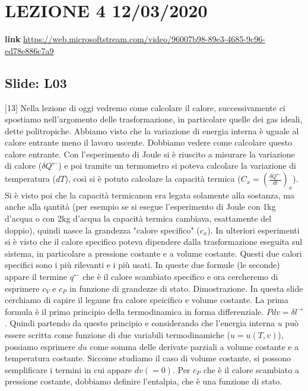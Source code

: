 \section{LEZIONE 4 12/03/2020}
\textbf{link} \url{https://web.microsoftstream.com/video/96007b98-89e3-4685-9c96-ed78e886c7a9}
\subsection{Slide: L03}
[13] Nella lezione di oggi vedremo come calcolare il calore, successivamente ci spostiamo nell'argomento delle trasformazione, in particolare quelle dei gas ideali, dette politropiche. Abbiamo visto che la variazione di energia interna è uguale al calore entrante meno il lavoro uscente. Dobbiamo vedere come calcolare questo calore entrante. Con l'esperimento di Joule si è riuscito a misurare la variazione di calore ($\delta Q^\leftarrow $) e poi tramite un termometro si poteva calcolare la variazione di temperatura ($dT$), così si è potuto calcolare la capacità termica ($C_x = \left(\frac{\delta Q^\leftarrow }{dt}\right)_x$). Si è visto poi che la capacità termicanon era legata solamente alla sostanza, ma anche alla qantità (per esempio se si esegue l'esperimento di Joule con 1kg d'acqua o con 2kg d'acqua la capacità termica cambiava, esattamente del doppio), quindi nasce la grandezza "calore specifico" ($c_x$).
\newline[14] In ulteriori esperimenti si è visto che il calore specifico poteva dipendere dalla trasformazione eseguita sul sistema, in particolare a pressione costante e a volume costante. Questi due calori specifici sono i più rilevanti e i più usati. In queste due formule (le seconde) appare il termine $q^\leftarrow $ che è il calore scambiato specifico e ora cercheremo di esprimere $c_V$ e $c_P$ in funzione di grandezze di stato.
\newline[15] Dimostrazione. In questa slide cerchiamo di capire il legame fra calore speicifico e volume costante. La prima formula è il primo principio della termodinamica in forma differenziale. $Pdv = \delta l^\rightarrow $. Quindi partendo da questo principio e considerando che l'energia interna $u$ può essere scritta come funzione di due variabili termodinamiche ($u = u(T,v)$), possiamo esprimere $du$ come somma delle derivate parziali a volume costante e a temperatura costante. Siccome studiamo il caso di volume costante, si possono semplificare i termini in cui appare $dv (=0)$.
\newline[16] Per $c_P$ che è il  calore scambiato a pressione costante, dobbiamo definire l'entalpia, che è una funzione di stato.

